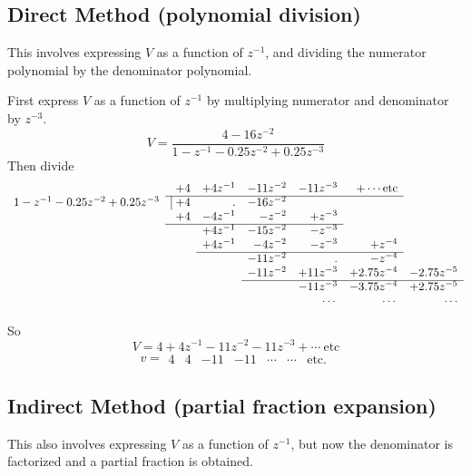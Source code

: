 \subsection*{Direct Method (polynomial division)}
This involves expressing $V$ as a function of $z^{-1}$, and
dividing the numerator polynomial by the denominator polynomial.

First express $V$ as a function of $z^{-1}$ by multiplying numerator
and denominator by $z^{-3}$.
\[ V = \frac{4-16z^{-2}}{1-z^{-1}-0.25 z^{-2} + 0.25 z^{-3}} \]
Then divide \[
\begin{array}{rrrrrrr}
   & +4 & +4z^{-1} & -11z^{-2} & -11z^{-3} & +\cdots  \mathrm{etc}& \\ \cline{2-6}
  1-z^{-1}-0.25
z^{-2} + 0.25 z^{-3} &  \vline\ +4 & . & -16z^{-2} &  & &
\\
   & +4 & -4z^{-1} & -z^{-2} & +z^{-3} &  &  \\ \cline{2-5}
   &  &   +4z^{-1} & -15z^{-2} & -z^{-3} &  &  \\
   &  &   +4z^{-1} & - 4z^{-2} & -z^{-3} & +z^{-4} &  \\
   \cline{3-6}
   &  &           & -11z^{-2} & .         &    -z^{-4} &  \\
   &  &           & -11z^{-2} & +11z^{-3} & +2.75z^{-4} & -2.75z^{-5}
   \\\cline{4-7}
  &   &           &           & -11z^{-3} & -3.75z^{-4} &
  +2.75z^{-5} \\
    &   &           &           & \cdots & \cdots &
  \cdots \\
\end{array}
\]

So \[ V = 4 + 4z^{-1} -11 z^{-2} -11z^{-3} + \cdots\
\mathrm{etc}\] \[ v = \begin{array}{ccccccc}
  4 & 4 & -11 & -11 & \cdots & \cdots & \mathrm{etc}.
\end{array} \]

\subsection*{Indirect Method (partial fraction expansion)}
This also involves expressing $V$ as a function of $z^{-1}$, but
now the denominator is factorized and a partial fraction is
obtained.

